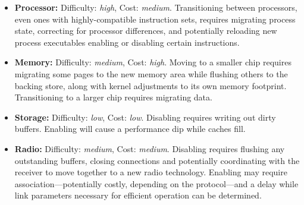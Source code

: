 \begin{itemize}

\item \textbf{Processor:} Difficulty: \textit{high}, Cost: \textit{medium}.
Transitioning between processors, even ones with highly-compatible
instruction sets, requires migrating process state, correcting for processor
differences, and potentially reloading new process executables enabling or
disabling certain instructions.

\item \textbf{Memory:} Difficulty: \textit{medium}, Cost: \textit{high}.
Moving to a smaller chip requires migrating some pages to the new memory area
while flushing others to the backing store, along with kernel adjustments to
its own memory footprint. Transitioning to a larger chip requires migrating
data.

\item \textbf{Storage:} Difficulty: \textit{low}, Cost: \textit{low}.
Disabling requires writing out dirty buffers. Enabling will cause a
performance dip while caches fill.

\item \textbf{Radio:} Difficulty: \textit{medium}, Cost: \textit{medium}.
Disabling requires flushing any outstanding buffers, closing connections and
potentially coordinating with the receiver to move together to a new radio
technology. Enabling may require association---potentially costly, depending
on the protocol---and a delay while link parameters necessary for efficient
operation can be determined.

\end{itemize}

